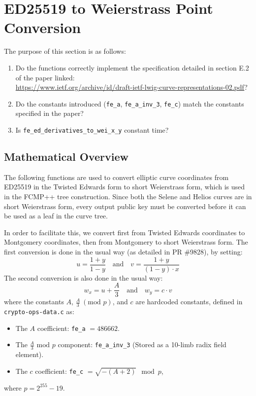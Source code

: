 \documentclass[12pt,titlepage,table]{article}
\begin{document}
\newpage
\section{ED25519 to Weierstrass Point Conversion}
The purpose of this section is as follows:
\begin{enumerate}
    \item Do the functions correctly implement the specification detailed in section E.2 of the paper linked: \\ {\small{\url{https://www.ietf.org/archive/id/draft-ietf-lwig-curve-representations-02.pdf}}}?
    \item Do the constants introduced (\verb+fe_a+, \verb+fe_a_inv_3+, \verb+fe_c+) match the constants specified in the paper?
    \item Is \verb+fe_ed_derivatives_to_wei_x_y+ constant time?
\end{enumerate}

\subsection{Mathematical Overview}
The following functions are used to convert elliptic curve coordinates from ED25519 in the Twisted Edwards form to short Weierstrass form, which is used in the FCMP++ tree construction. Since both the Selene and Helios curves are in short Weierstrass form, every output public key must be converted before it can be used as a leaf in the curve tree.

\medskip
In order to facilitate this, we convert first from Twisted Edwards coordinates to Montgomery coordinates, then from Montgomery to short Weierstrass form. The first conversion is done in the usual way (as detailed in PR \#9828), by setting:
$$u = \frac{1 + y}{1 - y} \, \, \, \, \text{ and } \, \, \, \, v =\frac{1+y}{(1-y) \cdot x}$$
The second conversion is also done in the usual way:
$$w_x = u + \frac{A}{3} \, \, \, \, \text{ and } \, \, \, \, w_y = c \cdot v$$
where the constants $A$, $\frac{A}{3} \ (\text{mod } p)$, and $c$ are hardcoded constants, defined in \verb+crypto-ops-data.c+ as:
\begin{itemize}
    \item The $A$ coefficient: \verb+fe_a+ $=486662$.
    \item The $\frac{A}{3} \text{ mod } p$ component: \verb+fe_a_inv_3+ (Stored as a 10-limb radix field element).
    \item The $c$ coefficient: \verb+fe_c+ $= \sqrt{-(A+2)} \mod p$,
\end{itemize}
where $p = 2^{255}-19$.
\end{document}
